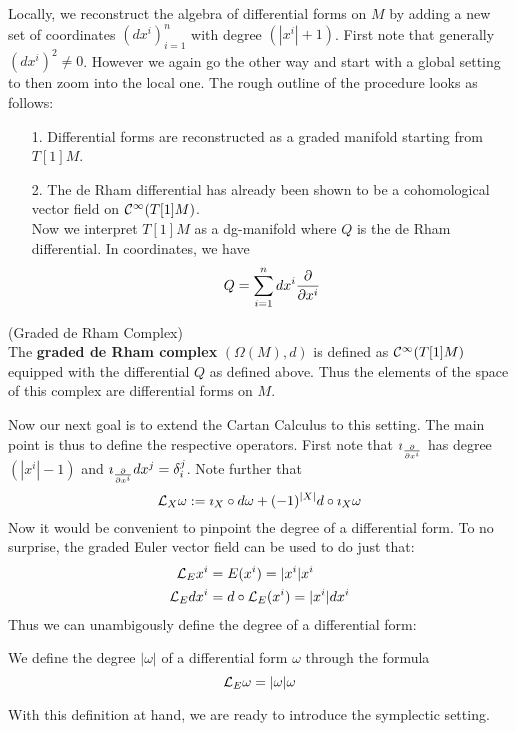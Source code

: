 Locally, we reconstruct the algebra of differential forms on $M$ by adding a new set of coordinates $(dx^i)^n_{i=1}$ with degree $(|x^i|+1)$. First note that generally $(dx^i)^2 \neq 0$. However we again go the other way and start with a global setting to then zoom into the local one. The rough outline of the procedure looks as follows:

\begin{itemize}
  \item[1.] Differential forms are reconstructed as a graded manifold starting from $T[1]M$.
  \item[2.] The de Rham differential has already been shown to be a cohomological vector field on $\mathcal{C}^{\infty}(T[1]M)$.\\
  Now we interpret $T[1]M$ as a dg-manifold where $Q$ is the de Rham differential. In coordinates, we have
  $$ Q = \sum_{i=1}^n dx^i \frac{\partial }{\partial x^i} $$
\end{itemize}

\begin{definition} (Graded de Rham Complex)\\
  The \textbf{graded de Rham complex} $(\Omega(M), d)$ is defined as $\mathcal{C}^{\infty}(T[1]M)$ equipped with the differential $Q$ as defined above. Thus the elements of the space of this complex are differential forms on $M$.
\end{definition}

Now our next goal is to extend the Cartan Calculus to this setting. The main point is thus to define the respective operators. First note that $ \imath_{\frac{\partial }{\partial x^i}} $ has degree $(|x^i|-1)$ and $ \imath_{\frac{\partial }{\partial x^i}} dx^j = \delta^j_i $. Note further that
$$ \mathcal{L}_{X}\omega := \imath_X \circ d\omega + (-1)^{|X|} d \circ \imath_X \omega $$
Now it would be convenient to pinpoint the degree of a differential form. To no surprise, the graded Euler vector field can be used to do just that:
\begin{align}
  \mathcal{L}_{E} x^i &= E(x^i) = |x^i| x^i\\
  \mathcal{L}_{E} dx^i &= d \circ \mathcal{L}_{E}(x^i) = |x^i| dx^i
\end{align}
Thus we can unambigously define the degree of a differential form:

\begin{definition}
  We define the degree $|\omega|$ of a differential form $\omega$ through the formula
  $$ \mathcal{L}_{E}\omega = |\omega| \omega $$
\end{definition}

With this definition at hand, we are ready to introduce the symplectic setting.

